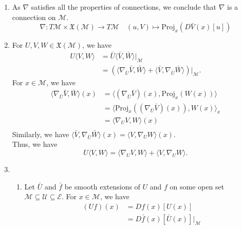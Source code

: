 \documentclass[en, oneside]{assignment}
\begin{document}
\begin{sol}
\begin{enumerate}[label=(\arabic*)]
        \item As $\nabla$ satisfies all the properties of connections, we conclude that $\nabla$ is a connection on $\mathcal{M}$.
        \begin{equation*}
            \nabla: T \mathcal{M} \times \mathfrak{X} (\mathcal{M}) \to T \mathcal{M} \quad (u, V) \mapsto \text{Proj} _x \left( D \bar{V} (x) [u] \right)
        \end{equation*}
        \item For $U, V, W \in \mathfrak{X} (\mathcal{M})$, we have
        \begin{align*}
            U \langle V, W \rangle &= \bar{U} \langle \bar{V}, \bar{W} \rangle | _\mathcal{M}\\
            &= \left( \langle \nabla _{\bar{U}} \bar{V}, \bar{W} \rangle + \langle \bar{V}, \nabla _{\bar{U}} \bar{W} \rangle \right) | _\mathcal{M}.
        \end{align*}
        For $x \in \mathcal{M}$, we have
        \begin{align*}
            \langle \nabla _{\bar{U}} \bar{V}, \bar{W} \rangle (x) &= \langle (\nabla _{\bar{U}} \bar{V})(x), \text{Proj} _x (W(x)) \rangle\\
            &= \langle \text{Proj} _x \left( (\nabla _{\bar{U}}\bar{V}) (x)\right), W(x) \rangle _x\\
            &= \langle \nabla _U V, W \rangle (x)\\
        \end{align*}
        Similarly, we have $\langle \bar{V}, \nabla _{\bar{U}} \bar{W} \rangle (x) = \langle V, \nabla _U W \rangle (x)$.\\
        Thus, we have
        \begin{equation*}
            U \langle V, W \rangle = \langle \nabla _U V, W \rangle + \langle V, \nabla _U W \rangle.
        \end{equation*}
        \item 
        \begin{enumerate}[label=(\alph*)]
            \item Let $\bar{U}$ and $\bar{f}$ be smooth extensions of $U$ and $f$ on some open set $\mathcal{M} \subseteq \mathcal{U} \subseteq \mathcal{E}$.
            For $x \in \mathcal{M}$, we have
            \begin{align*}
                (U f) (x) &= D f (x) [U(x)]\\
                &= D \bar{f} (x) [\bar{U} (x)] | _\mathcal{M}\\

\end{align*}
\end{enumerate}
\end{enumerate}
\end{sol}
\end{document}
